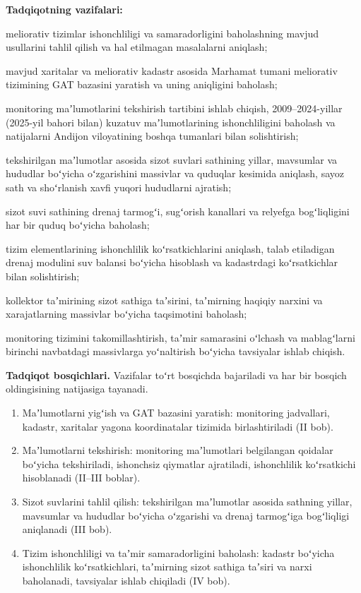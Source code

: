 \textbf{Tadqiqotning vazifalari:}

meliorativ tizimlar ishonchliligi va samaradorligini baholashning mavjud
usullarini tahlil qilish va hal etilmagan masalalarni aniqlash;

mavjud xaritalar va meliorativ kadastr asosida Marhamat tumani
meliorativ tizimining GAT bazasini yaratish va uning aniqligini
baholash;

monitoring maʼlumotlarini tekshirish tartibini ishlab chiqish,
2009--2024-yillar (2025-yil bahori bilan) kuzatuv maʼlumotlarining
ishonchliligini baholash va natijalarni Andijon viloyatining boshqa
tumanlari bilan solishtirish;

tekshirilgan maʼlumotlar asosida sizot suvlari sathining yillar,
mavsumlar va hududlar boʻyicha oʻzgarishini massivlar va quduqlar
kesimida aniqlash, sayoz sath va shoʻrlanish xavfi yuqori hududlarni
ajratish;

sizot suvi sathining drenaj tarmogʻi, sugʻorish kanallari va relyefga
bogʻliqligini har bir quduq boʻyicha baholash;

tizim elementlarining ishonchlilik koʻrsatkichlarini aniqlash, talab
etiladigan drenaj modulini suv balansi boʻyicha hisoblash va kadastrdagi
koʻrsatkichlar bilan solishtirish;

kollektor taʼmirining sizot sathiga taʼsirini, taʼmirning haqiqiy
narxini va xarajatlarning massivlar boʻyicha taqsimotini baholash;

monitoring tizimini takomillashtirish, taʼmir samarasini oʻlchash va
mablagʻlarni birinchi navbatdagi massivlarga yoʻnaltirish boʻyicha
tavsiyalar ishlab chiqish.

\textbf{Tadqiqot bosqichlari.} Vazifalar toʻrt bosqichda bajariladi va
har bir bosqich oldingisining natijasiga tayanadi.

\begin{enumerate}
\def\labelenumi{\arabic{enumi}.}
\tightlist
\item
  Maʼlumotlarni yigʻish va GAT bazasini yaratish: monitoring jadvallari,
  kadastr, xaritalar yagona koordinatalar tizimida birlashtiriladi (II
  bob).
\item
  Maʼlumotlarni tekshirish: monitoring maʼlumotlari belgilangan qoidalar
  boʻyicha tekshiriladi, ishonchsiz qiymatlar ajratiladi, ishonchlilik
  koʻrsatkichi hisoblanadi (II--III boblar).
\item
  Sizot suvlarini tahlil qilish: tekshirilgan maʼlumotlar asosida
  sathning yillar, mavsumlar va hududlar boʻyicha oʻzgarishi va drenaj
  tarmogʻiga bogʻliqligi aniqlanadi (III bob).
\item
  Tizim ishonchliligi va taʼmir samaradorligini baholash: kadastr
  boʻyicha ishonchlilik koʻrsatkichlari, taʼmirning sizot sathiga
  taʼsiri va narxi baholanadi, tavsiyalar ishlab chiqiladi (IV bob).
\end{enumerate}


